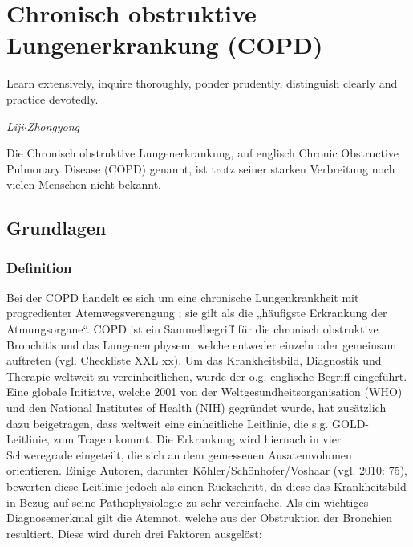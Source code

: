 \ifpdf
    \graphicspath{{2_chronisch_obstruktive_lungenerkrankung/figures/PNG/}{2_chronisch_obstruktive_lungenerkrankung/figures/PDF/}{2_chronisch_obstruktive_lungenerkrankung/figures/}}
\else
    \graphicspath{{2_chronisch_obstruktive_lungenerkrankung/figures/EPS/}{2_chronisch_obstruktive_lungenerkrankung/figures/}}
\fi

\chapter{Chronisch obstruktive Lungenerkrankung (COPD)}
\label{copd}
\setlength{\epigraphwidth}{6.0cm}
\epigraph{Learn extensively, inquire thoroughly, ponder prudently, distinguish clearly and practice devotedly.}{\emph{Liji$\cdot$Zhongyong}}



Die Chronisch obstruktive Lungenerkrankung, auf englisch Chronic Obstructive Pulmonary Disease (COPD) genannt, ist trotz seiner starken Verbreitung noch vielen Menschen nicht bekannt.

\section{Grundlagen} %
\label{grundlagen}

\subsection{Definition}
\label{definition}
Bei der COPD handelt es sich um eine chronische Lungenkrankheit mit progredienter Atemwegsverengung ; sie gilt als die „häufigste Erkrankung der Atmungsorgane“. COPD ist ein Sammelbegriff für die chronisch obstruktive Bronchitis und das Lungenemphysem, welche entweder einzeln oder gemeinsam auftreten (vgl. Checkliste XXL xx). Um das Krankheitsbild, Diagnostik und Therapie weltweit zu vereinheitlichen, wurde der o.g. englische Begriff eingeführt. Eine globale Initiatve, welche 2001 von der Weltgesundheitsorganisation (WHO) und den National Institutes of Health (NIH) gegründet wurde, hat zusätzlich dazu beigetragen, dass weltweit eine einheitliche Leitlinie, die s.g. GOLD-Leitlinie, zum Tragen kommt. Die Erkrankung wird hiernach in vier Schweregrade eingeteilt, die sich an dem gemessenen Ausatemvolumen orientieren. Einige Autoren, darunter Köhler/Schönhofer/Voshaar (vgl. 2010: 75), bewerten diese Leitlinie jedoch als einen Rückschritt, da diese das Krankheitsbild in Bezug auf seine Pathophysiologie zu sehr vereinfache.
Als ein wichtiges Diagnosemerkmal gilt die Atemnot, welche aus der Obstruktion der Bronchien resultiert. Diese wird durch drei Faktoren ausgelöst: 

